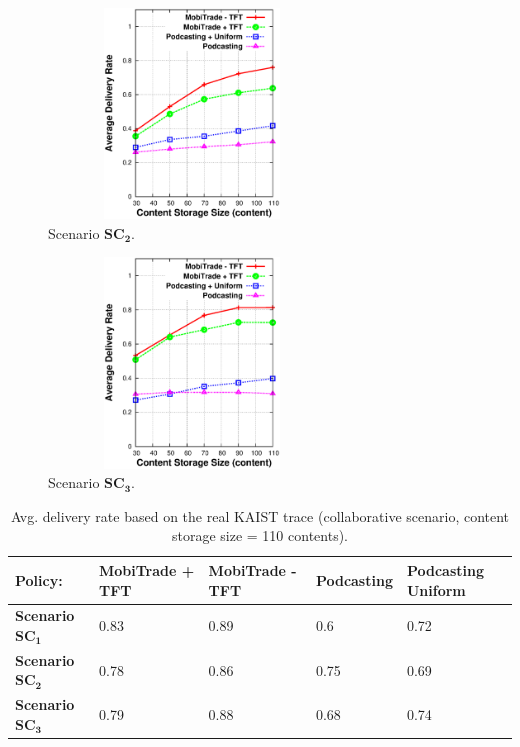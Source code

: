 \begin{figure}[!h]
  \begin{center}
    \includegraphics[width=3in,height=2.2in]{Chapitre5/fig4.eps}
  \end{center}
  \caption{Scenario $\mathbf{SC_2}$.}
  \label{CS+RNC+FCS}
\end{figure}

\begin{figure}[!h]
  \begin{center}
    \includegraphics[width=3in,height=2.2in]{Chapitre5/fig7.eps}
  \end{center}
  \caption{Scenario $\mathbf{SC_3}$.}
  \label{CS+FNC+RCS}
\end{figure}


\begin{table}[!h]
\caption{Avg. delivery rate based on the real KAIST trace (collaborative scenario, content storage size = 110 contents).}
\centering
\label{table:kaist:col}
\footnotesize
\begin{tabular}{|p{3cm}|p{2cm}|p{2cm}|p{2cm}|p{2cm}|}
\hline
\bfseries Policy:& \bfseries MobiTrade + TFT & \bfseries MobiTrade - TFT & \bfseries Podcasting & \bfseries Podcasting Uniform\\
\hline
\bfseries Scenario $\mathbf{SC_{1}}$ & 0.83 & 0.89&0.6 &0.72\\
\hline
\bfseries Scenario $\mathbf{SC_{2}}$ & 0.78 &0.86 &0.75 &0.69\\
\hline
\bfseries Scenario $\mathbf{SC_{3}}$ &0.79  &0.88 &0.68 &0.74\\
\hline
\end{tabular}
\end{table}

